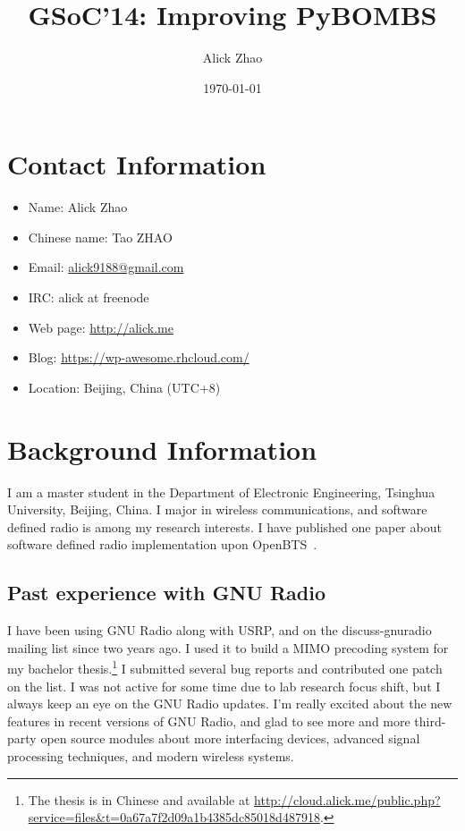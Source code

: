 \documentclass[a4paper]{article}
\begin{document}
\title{GSoC'14: Improving PyBOMBS}
\author{Alick Zhao}
\date{\today}
\maketitle

\section{Contact Information}

\begin{itemize}
  \item Name: Alick Zhao
  \item Chinese name: Tao ZHAO
  \item Email: \url{alick9188@gmail.com}
  \item IRC: alick at freenode
  \item Web page: \url{http://alick.me}
  \item Blog: \url{https://wp-awesome.rhcloud.com/}
  \item Location: Beijing, China (UTC+8)
\end{itemize}

\section{Background Information}

I am a master student in the Department of Electronic Engineering, Tsinghua
University, Beijing, China. I major in wireless communications, and
software defined radio is among my research interests. I have published
one paper about software defined radio implementation upon
OpenBTS~\cite{zhao2013software}.

\subsection{Past experience with GNU Radio}

I have been using GNU Radio along with USRP, and
on the discuss-gnuradio mailing list since two years ago.
I used it to build a MIMO precoding system for my bachelor thesis.\footnote{%
The thesis is in Chinese and available at %
\url{http://cloud.alick.me/public.php?service=files&t=0a67a7f2d09a1b4385dc85018d487918}.}%
I submitted several bug reports and contributed one patch on the list.
I was not active for some time due to lab research focus shift, but I
always keep an eye on the GNU Radio updates.  I'm really excited about
the new features in recent versions of GNU Radio, and glad to see more and more
third-party open source modules about more interfacing devices, advanced
signal processing techniques, and modern wireless systems.
\end{document}
